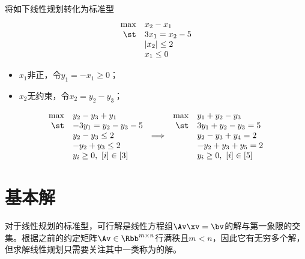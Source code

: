 \documentclass{ctexart}
\begin{document}
\begin{example}
    将如下线性规划转化为标准型
    \begin{align*}
        \begin{array}{rlcrl}
            \max & x_2 - x_1       \\
            \st  & 3 x_1 = x_2 - 5 \\
                 & |x_2| \le 2     \\
                 & x_1 \le 0
        \end{array}
    \end{align*}
    \begin{itemize}
        \item $x_1$非正，令$y_1 = -x_1 \ge 0$；
        \item $x_2$无约束，令$x_2 = y_2 - y_3$；
    \end{itemize}
    \begin{align*}
        \begin{array}{rlcrl}
            \max & y_2 - y_3 + y_1          &                 & \max & y_1 + y_2 - y_3          \\
            \st  & -3 y_1 = y_2 - y_3 - 5   &                 & \st  & 3 y_1 + y_2 - y_3 = 5    \\
                 & y_2 - y_3 \le 2          & \Longrightarrow &      & y_2 - y_3 + y_4 = 2      \\
                 & -y_2 + y_3 \le 2         &                 &      & -y_2 + y_3 + y_5 = 2     \\
                 & y_i \ge 0, ~ [i] \in [3] &                 &      & y_i \ge 0, ~ [i] \in [5]
        \end{array}
    \end{align*}
\end{example}

\section{基本解}

对于线性规划的标准型，可行解是线性方程组$\Av \xv = \bv$的解与第一象限的交集。根据之前的约定矩阵$\Av \in \Rbb^{m \times n}$行满秩且$m < n$，因此它有无穷多个解，但求解线性规划只需要关注其中一类称为的解。
\end{document}
